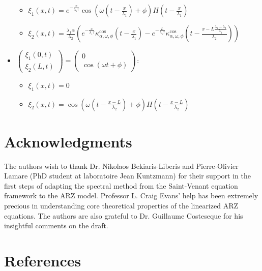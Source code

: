 \documentclass[preprint]{elsarticle}
\begin{document}
\begin{itemize}
\begin{itemize}
\item $\xi_{1}\left(x,t\right)=e^{-\frac{x}{\lambda_{1}\tau}}\cos\left(\omega\left(t-\frac{x}{\lambda_{1}}\right)+\phi\right)H\left(t-\frac{x}{\lambda_{1}}\right)$
\item $\xi_{2}\left(x,t\right)=\frac{\lambda_{1}\alpha}{\lambda_{2}}\left(e^{-\frac{x}{\lambda_{1}\tau}}\kappa_{\alpha,\omega,\phi}^{\text{cos}}\left(t-\frac{x}{\lambda_{1}}\right)-e^{-\frac{L}{\lambda_{1}\tau}}\kappa_{\alpha,\omega,\phi}^{\text{cos}}\left(t-\frac{x-L\frac{\lambda_{1}-\lambda_{2}}{\lambda_{1}}}{\lambda_{2}}\right)\right)$
\end{itemize}
\item $\left(\begin{array}{c}
\xi_{1}\left(0,t\right)\\
\xi_{2}\left(L,t\right)
\end{array}\right)=\left(\begin{array}{c}
0\\
\cos\left(\omega t+\phi\right)
\end{array}\right)$:

\begin{itemize}
\item $\xi_{1}\left(x,t\right)=0$
\item $\xi_{2}\left(x,t\right)=\cos\left(\omega\left(t-\frac{x-L}{\lambda_{2}}\right)+\phi\right)H\left(t-\frac{x-L}{\lambda_{2}}\right)$\end{itemize}
\end{itemize}

\section*{Acknowledgments}
The authors wish to thank Dr. Nikolaos Bekiaris-Liberis and Pierre-Olivier Lamare (PhD student at laboratoire Jean Kuntzmann) for their support in the first steps of adapting the spectral method from the Saint-Venant equation framework to the ARZ model. Professor L. Craig Evans' help has been extremely precious in understanding core theoretical properties of the linearized ARZ equations. The authors are also grateful to Dr. Guillaume Costeseque for his insightful comments on the draft.


\section*{References}


\end{document}
